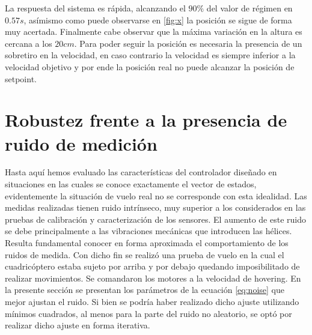 \documentclass[main]{subfiles}
\begin{document}
La respuesta del sistema es r\'apida, alcanzando el $90\%$ del valor de r\'egimen en $0.57s$, as\'imismo como puede observarse en \ref{fig:x} la posici\'on se sigue de forma muy acertada. Finalmente cabe observar que la m\'axima variaci\'on en la altura es cercana a los $20cm$. Para poder seguir la posici\'on es necesaria la presencia de un sobretiro en la velocidad, en caso contrario la velocidad es siempre inferior a la velocidad objetivo y por ende la posici\'on real no puede alcanzar la posici\'on de setpoint.

%
%

\section{Robustez frente a la presencia de ruido de medici\'on}

Hasta aqu\'i hemos evaluado las caracter\'isticas del controlador diseñado en situaciones en las cuales se conoce exactamente el vector de estados, evidentemente la situaci\'on de vuelo real no se corresponde con esta idealidad. Las medidas realizadas tienen ruido intr\'inseco, muy superior a los considerados en las pruebas de calibraci\'on y caracterizaci\'on de los sensores. El aumento de este ruido se debe principalmente a las vibraciones mec\'anicas que introducen las h\'elices.\\

Resulta fundamental conocer en forma aproximada el comportamiento de los ruidos de medida. Con dicho fin se realiz\'o una prueba de vuelo en la cual el cuadric\'optero estaba sujeto por arriba y por debajo quedando imposibilitado de realizar movimientos. Se comandaron los motores a la velocidad de hovering. En la presente secci\'on se presentan los par\'ametros de la ecuaci\'on \ref{eq:noise} que mejor ajustan el ruido. Si bien se podr\'ia haber realizado dicho ajuste utilizando m\'inimos cuadrados, al menos para la parte del ruido no aleatorio, se opt\'o por realizar dicho ajuste en forma iterativa.\\
\end{document}
